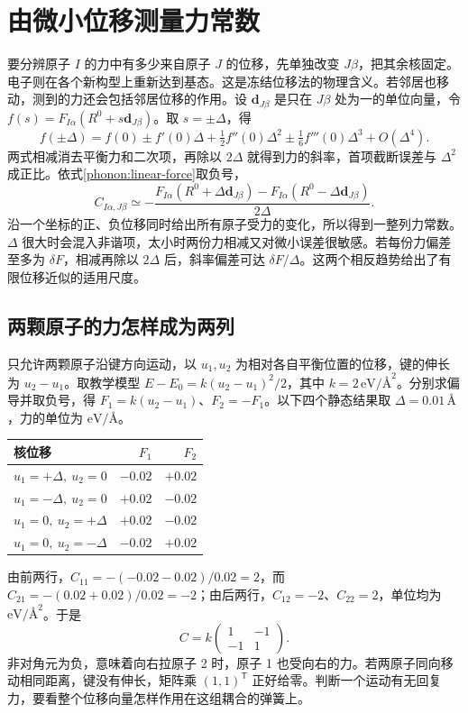 \section{由微小位移测量力常数}
要分辨原子 $I$ 的力中有多少来自原子 $J$ 的位移，先单独改变 $J\beta$，把其余核固定。电子则在各个新构型上重新达到基态。这是冻结位移法的物理含义。若邻居也移动，测到的力还会包括邻居位移的作用。设 $\bm d_{J\beta}$ 是只在 $J\beta$ 处为一的单位向量，令 $f(s)=F_{I\alpha}(R^0+s\bm d_{J\beta})$。取 $s=\pm\Delta$，得
\[
 f(\pm\Delta)=f(0)\pm f'(0)\Delta+\tfrac12 f''(0)\Delta^2
 \pm\tfrac16 f'''(0)\Delta^3+O(\Delta^4).
\]
两式相减消去平衡力和二次项，再除以 $2\Delta$ 就得到力的斜率，首项截断误差与 $\Delta^2$ 成正比。依式\eqref{phonon:linear-force}取负号，
\begin{equation}\label{phonon:central}
 C_{I\alpha,J\beta}\simeq-
 \frac{F_{I\alpha}(R^0+\Delta\bm d_{J\beta})-F_{I\alpha}(R^0-\Delta\bm d_{J\beta})}{2\Delta}.
\end{equation}
沿一个坐标的正、负位移同时给出所有原子受力的变化，所以得到一整列力常数。$\Delta$ 很大时会混入非谐项，太小时两份力相减又对微小误差很敏感。若每份力偏差至多为 $\delta F$，相减再除以 $2\Delta$ 后，斜率偏差可达 $\delta F/\Delta$。这两个相反趋势给出了有限位移近似的适用尺度。

\subsection{两颗原子的力怎样成为两列}
只允许两颗原子沿键方向运动，以 $u_1,u_2$ 为相对各自平衡位置的位移，键的伸长为 $u_2-u_1$。取教学模型 $E-E_0=k(u_2-u_1)^2/2$，其中 $k=2\,\mathrm{eV}/\text{\AA}^2$。分别求偏导并取负号，得 $F_1=k(u_2-u_1)$、$F_2=-F_1$。以下四个静态结果取 $\Delta=0.01\,\text{\AA}$，力的单位为 $\mathrm{eV}/\text{\AA}$。
\begin{center}
\begin{tabular}{lrr}
\toprule
核位移 & $F_1$ & $F_2$\\
\midrule
$u_1=+\Delta,\ u_2=0$ & $-0.02$ & $+0.02$\\
$u_1=-\Delta,\ u_2=0$ & $+0.02$ & $-0.02$\\
$u_1=0,\ u_2=+\Delta$ & $+0.02$ & $-0.02$\\
$u_1=0,\ u_2=-\Delta$ & $-0.02$ & $+0.02$\\
\bottomrule
\end{tabular}
\end{center}
由前两行，$C_{11}=-(-0.02-0.02)/0.02=2$，而 $C_{21}=-(0.02+0.02)/0.02=-2$；由后两行，$C_{12}=-2$、$C_{22}=2$，单位均为 $\mathrm{eV}/\text{\AA}^2$。于是
\[
 C=k\begin{pmatrix}1&-1\\-1&1\end{pmatrix}.
\]
非对角元为负，意味着向右拉原子 2 时，原子 1 也受向右的力。若两原子同向移动相同距离，键没有伸长，矩阵乘 $(1,1)^{\mathsf T}$ 正好给零。判断一个运动有无回复力，要看整个位移向量怎样作用在这组耦合的弹簧上。

